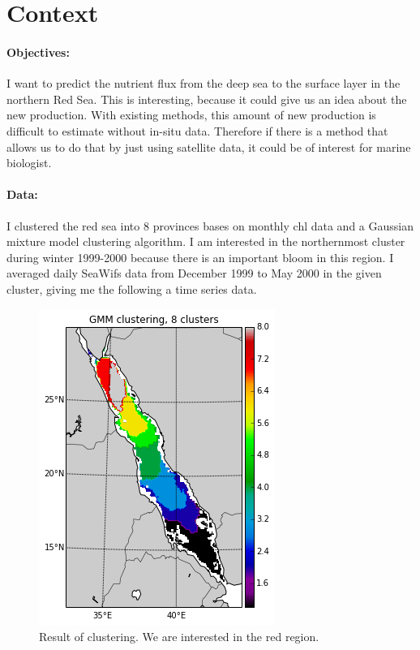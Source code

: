 \documentclass{article}
\begin{document}
  \section{Context}

  \paragraph{Objectives:}

  I want to predict the nutrient flux from the deep sea to the surface layer in the northern Red Sea. This is interesting, because it could give us an idea about the new production. With existing methods, this amount of new production is difficult to estimate without in-situ data. Therefore if there is a method that allows us to do that by just using satellite data, it could be of interest for marine biologist.

  \paragraph{Data:}

  I clustered the red sea into 8 provinces bases on monthly chl data and a Gaussian mixture model clustering algorithm. I am interested in the northernmost cluster during winter 1999-2000 because there is an important bloom in this region. I averaged daily SeaWifs data from December 1999 to May 2000 in the given cluster, giving me the following a time series data.


  \begin{figure}[ht]
  \centering
    \includegraphics[scale=.3]{./clusters.png}
  \caption{Result of clustering. We are interested in the red region.}
  \end{figure}
\end{document}
